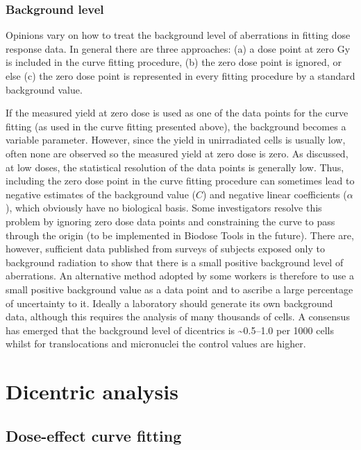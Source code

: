 \documentclass[]{scrartcl}
\begin{document}
\hypertarget{background-level}{%
\subsubsection{Background level}\label{background-level}}

Opinions vary on how to treat the background level of aberrations in fitting dose response data. In general there are three approaches: (a) a dose point at zero Gy is included in the curve fitting procedure, (b) the zero dose point is ignored, or else (c) the zero dose point is represented in every fitting procedure by a standard background value.

If the measured yield at zero dose is used as one of the data points for the curve fitting (as used in the curve fitting presented above), the background becomes a variable parameter. However, since the yield in unirradiated cells is usually low, often none are observed so the measured yield at zero dose is zero. As discussed, at low doses, the statistical resolution of the data points is generally low. Thus, including the zero dose point in the curve fitting procedure can sometimes lead to negative estimates of the background value (\(C\)) and negative linear coefficients (\(\alpha\)), which obviously have no biological basis. Some investigators resolve this problem by ignoring zero dose data points and constraining the curve to pass through the origin (to be implemented in Biodose Tools in the future). There are, however, sufficient data published from surveys of subjects exposed only to background radiation to show that there is a small positive background level of aberrations. An alternative method adopted by some workers is therefore to use a small positive background value as a data point and to ascribe a large percentage of uncertainty to it. Ideally a laboratory should generate its own background data, although this requires the analysis of many thousands of cells. A consensus has emerged that the background level of dicentrics is \textasciitilde0.5--1.0 per 1000 cells \citep{Lloyd1980} whilst for translocations \citep{Sigurdson2008} and micronuclei \citep{Fenech1993} the control values are higher.

\hypertarget{stats-dicent}{%
\section{Dicentric analysis}\label{stats-dicent}}

\hypertarget{dose-effect-curve-fitting-1}{%
\subsection{Dose-effect curve fitting}\label{dose-effect-curve-fitting-1}}
\end{document}
